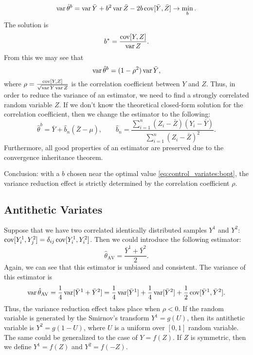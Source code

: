            \begin{equation*}
                \operatorname*{var} \hat\theta^b = \operatorname*{var} \bar Y + b^2 \operatorname*{var} \bar Z - 2b \operatorname*{cov} [\bar Y, \bar Z] \to \min_b.
            \end{equation*}
            The solution is
            \begin{equation}
                b^* = \frac{\operatorname*{cov} [Y, Z]}{\operatorname*{var} Z}.\label{eq:control_variates:bopt}
            \end{equation}
            From this we may see that
            \begin{equation*}
                \operatorname*{var} \hat\theta^b = (1-\rho^2) \operatorname*{var} \bar Y,            
            \end{equation*}
            where $\rho = \frac{\operatorname*{cov} [Y, Z]}{\sqrt{\operatorname*{var} Y \operatorname*{var} Z}}$ is the correlation coefficient between $Y$ and $Z$.
            Thus, in order to reduce the variance of an estimator, we need to find a strongly correlated random variable $Z$.
            If we don't know the theoretical closed-form solution for the correlation coefficient, then we change the estimator to the following:
            \begin{equation*}
                \hat\theta^b = \bar Y + \hat b_n(\bar Z - \mu), \qquad \hat b_n = \frac{\sum_{i=1}^n (Z_i - \bar Z)(Y_i - \bar Y)}{\sum_{i=1}^n (Z_i - \bar Z)^2}.
            \end{equation*}
            Furthermore, all good properties of an estimator are preserved due to the convergence inheritance theorem.

            Conclusion: with a $b$ chosen near the optimal value \eqref{eq:control_variates:bopt}, the variance reduction effect is strictly determined by the correlation coefficient $\rho$.

        \subsection{Antithetic Variates}
            Suppose that we have two correlated identically distributed samples $Y^1$ and $Y^2$: $\operatorname*{cov}[Y_i^1, Y_j^2] = \delta_{ij}\operatorname*{cov}[Y_i^1, Y_i^2]$.
            Then we could introduce the following estimator:
            \begin{equation}
                \hat\theta_{\operatorname{AV}} = \frac{\bar Y^1 + \bar Y^2}{2}.
            \end{equation}
            Again, we can see that this estimator is unbiased and consistent. The variance of this estimator is
            \begin{equation*}
                \operatorname*{var} \hat\theta_{\operatorname{AV}} = \frac{1}{4} \operatorname*{var}[\bar Y^1 + \bar Y^2] = \frac{1}{4} \operatorname*{var}[\bar Y^1] + \frac{1}{4} \operatorname*{var}[\bar Y^2] + \frac{1}{2} \operatorname*{cov}[\bar Y^1, \bar Y^2] .
            \end{equation*}
            Thus, the variance reduction effect takes place when $\rho < 0$.
            If the random variable is generated by the Smirnov's transform $Y^1 = g(U)$, then its antithetic variable is $Y^2 = g(1-U)$, where $U$ is a uniform over $[0, 1]$ random variable. 
            The same could be generalized to the case of $Y = f(Z)$. If $Z$ is symmetric, then we define $Y^1 = f(Z)$ and $Y^2 = f(-Z)$.

